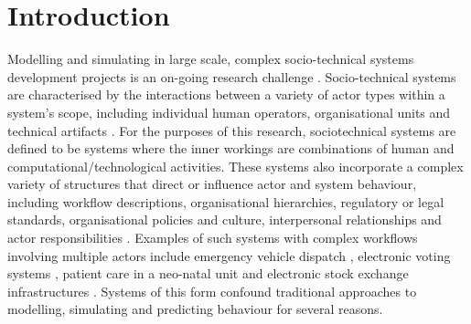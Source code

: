 \documentclass{sig-alternate}
\begin{document}

\section{Introduction}
\label{sec:introduction}


Modelling and simulating in large scale, complex socio-technical systems development projects is an on-going research
challenge \citep{baxter08learning}.  Socio-technical systems are characterised by the interactions between a variety of
actor types within a system's scope, including individual human operators, organisational units and technical artifacts
\citep{Susman1976,elhassan07role,sommerville08socio}. For the purposes of this research, sociotechnical systems are
defined to be systems where the inner workings are combinations of human and computational/technological
activities. These systems also incorporate a complex variety of structures that direct or influence actor and system
behaviour, including workflow descriptions, organisational hierarchies, regulatory or legal standards, organisational
policies and culture, interpersonal relationships and actor responsibilities
\citep{bade07structures,pentland05organisational}. Examples of such systems with complex workflows involving multiple
actors include emergency vehicle dispatch \citep{robinson96limited}, electronic voting systems
\citep{bryans04towards,lock07observations}, patient care in a neo-natal unit \citep{baxter07evaluating} and electronic
stock exchange infrastructures \citep{cftc-sec10findings}.  Systems of this form confound traditional approaches to
modelling, simulating and predicting behaviour for several reasons.
\end{document}
